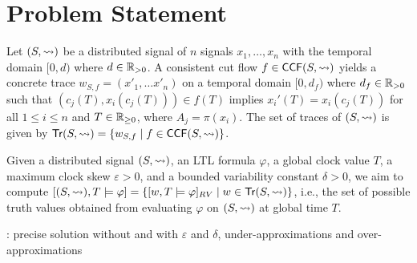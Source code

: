 \section{Problem Statement}
Let $(S,{\rightsquigarrow})$ be a distributed signal of $n$ signals $x_1, \ldots, x_n$ with the temporal domain $[0,d)$ where $d \in \mathbb{R}_{> 0}$.
A consistent cut flow $f \in \mathsf{CCF}(S,{\rightsquigarrow})$ yields a concrete trace $w_{S,f}= (x'_1, \ldots x'_n)$ on a temporal domain $[0,d_f)$ where $d_f \in \mathbb{R}_{> 0}$ such that $(c_j(T), x_i(c_j(T))) \in f(T)$ implies $x_i'(T) = x_i(c_j(T))$ for all $1 \leq i \leq n$ and $T \in \mathbb{R}_{\geq 0}$, where $A_j = \pi(x_i)$.
The set of traces of $(S,{\rightsquigarrow})$ is given by $\tr(S,{\hb}) = \{ w_{S,f} \st f \in \CCF(S,{\hb})\}$.


Given a distributed signal $(S, {\rightsquigarrow})$, an LTL formula $\varphi$, a global clock value $T$, a maximum clock skew $\varepsilon > 0$, and a bounded variability constant $\delta > 0$, we aim to compute $[(S, {\hb}), T \models \varphi] = \{[w, T \models \varphi]_{RV} \st w \in \tr(S, {\hb}) \}$, i.e., the set of possible truth values obtained from evaluating $\varphi$ on $(S, {\rightsquigarrow})$ at global time $T$.

\begin{example}
	\TODO: precise solution without and with $\varepsilon$ and $\delta$, under-approximations and over-approximations
\end{example}